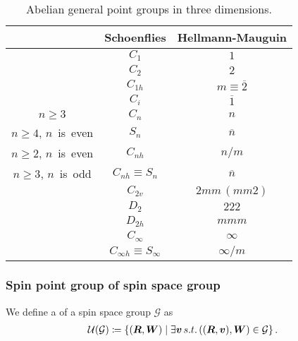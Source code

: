 \begin{table}[tb]
  \centering
  \caption{
    Abelian general point groups in three dimensions.
  }
  \label{tab:abelian_point_groups}
  \begin{tabular}{ccc}
    \hline \hline
    & Schoenflies & Hellmann-Mauguin \\
    \hline
    & $C_{1}$ & $1$                      \\
    & $C_{2}$ & $2$                      \\
    & $C_{1h}$ & $m \equiv \overline{2}$ \\
    & $C_{i}$ & $\overline{1}$           \\
    \hline
    $n \geq 3$                     & $C_{n}$               & $n$            \\
    $n \geq 4$, \mbox{$n$ is even} & $S_{n}$               & $\overline{n}$ \\
    $n \geq 2$, \mbox{$n$ is even} & $C_{nh}$              & $n / m$        \\
    $n \geq 3$, \mbox{$n$ is odd}  & $C_{nh} \equiv S_{n}$ & $\overline{n}$ \\
                                   & $C_{2v}$              & $2mm \,(mm2)$          \\
    \hline
    & $D_{2}$  & $222$ \\
    & $D_{2h}$ & $mmm$ \\
    \hline
    & $C_{\infty}$                       & $\infty$     \\
    & $C_{\infty h} \equiv S_{\infty}$   & $\infty / m$ \\
    \hline \hline
  \end{tabular}
\end{table}

\subsubsection{\label{sec:family_spin_point_group}Spin point group of spin space group}

We define a  of a spin space group $\mathcal{G}$ as
\begin{align}
    \mathcal{U}(\mathcal{G}) \coloneqq \left\{  (\bm{R}, \bm{W})  \mathrel{}\middle|\mathrel{}  \exists \bm{v} \,s.t.\, ((\bm{R}, \bm{v}), \bm{W}) \in \mathcal{G}  \right\}.
\end{align}

